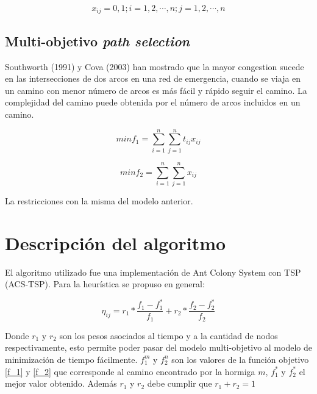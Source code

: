 \documentclass[letter, 10pt]{article}
\begin{document}
\begin{equation}
	x_{ij} = 0,1;i=1,2,\cdots,n;j=1,2,\cdots,n
\end{equation}

\subsection{Multi-objetivo \textit{path selection}}

Southworth (1991) \cite{southworth1991regional} y Cova (2003) han mostrado que la mayor congestion sucede en las intersecciones de dos arcos en una red de emergencia, cuando se viaja en un camino con menor número de arcos es más fácil y rápido seguir el camino. La complejidad del camino puede obtenida por el número de arcos incluidos en un camino. 


\begin{equation}\label{f_1}
	min f_1 = \sum_{i=1}^{n}\sum_{j=1}^{n} t_{ij}x_{ij}
\end{equation}


\begin{equation}\label{f_2}
	min f_2 = \sum_{i=1}^{n}\sum_{j=1}^{n} x_{ij}
\end{equation}

La restricciones con la misma del modelo anterior.

\section{Descripción del algoritmo}

El algoritmo utilizado fue una implementación de Ant Colony System con TSP (ACS-TSP). Para la heurística se propuso en general:

\begin{equation}
	\eta_{ij} = r_1*\frac{f_1 - f_1^*}{f_1} + r_2*\frac{f_2 - f_2^*}{f_2}
\end{equation}

Donde $r_1$ y $r_2$ son los pesos asociados al tiempo y a la cantidad de nodos respectivamente, esto permite poder pasar del modelo multi-objetivo al modelo de minimización de tiempo fácilmente.  $f_1^m$ y $f_2^n$ son los valores de la función objetivo \eqref{f_1} y \eqref{f_2} que corresponde al camino encontrado por la hormiga $m$, $f_1^*$ y $f_2^*$ el mejor valor obtenido. Además $r_1$ y $r_2$ debe cumplir que $r_1 + r_2 = 1$
\end{document}
